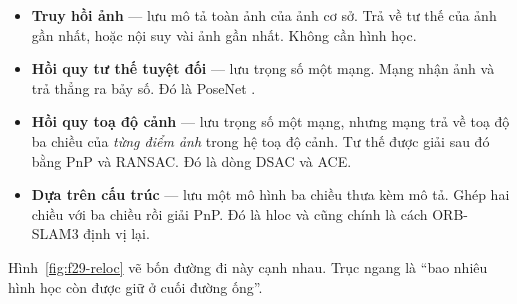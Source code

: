 \documentclass[../../deep_learning.tex]{subfiles}
\begin{document}
\begin{itemize}
\item \textbf{Truy hồi ảnh} --- lưu mô tả toàn ảnh của ảnh cơ sở. Trả về tư thế của ảnh gần nhất, hoặc nội suy vài ảnh gần nhất. Không cần hình học.
\item \textbf{Hồi quy tư thế tuyệt đối} --- lưu trọng số một mạng. Mạng nhận ảnh và trả thẳng ra bảy số. Đó là PoseNet \cite{f29kendall2015posenet}.
\item \textbf{Hồi quy toạ độ cảnh} --- lưu trọng số một mạng, nhưng mạng trả về toạ độ ba chiều của \emph{từng điểm ảnh} trong hệ toạ độ cảnh. Tư thế được giải sau đó bằng PnP và RANSAC. Đó là dòng DSAC và ACE.
\item \textbf{Dựa trên cấu trúc} --- lưu một mô hình ba chiều thưa kèm mô tả. Ghép hai chiều với ba chiều rồi giải PnP. Đó là hloc và cũng chính là cách ORB-SLAM3 định vị lại.
\end{itemize}

Hình~\ref{fig:f29-reloc} vẽ bốn đường đi này cạnh nhau. Trục ngang là ``bao nhiêu hình học còn được giữ ở cuối đường ống''.
\end{document}
